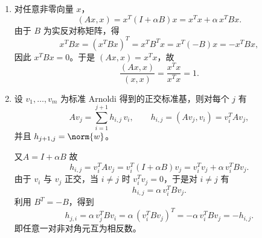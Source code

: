 \documentclass{ctexart}
\begin{document}
\begin{solution}
  \begin{enumerate}
    \item 对任意非零向量 $x$，
      \[
        (Ax,x) = x^T (I+\alpha B) x = x^T x + \alpha\, x^T B x.
      \]
      由于 $B$ 为实反对称矩阵，得
      \[
        x^T B x = (x^T B x)^T = x^T B^T x = x^T(-B) x = - x^T B x,
      \]
      因此 $x^T B x = 0$。于是 $(Ax,x)=x^T x$，故
      \[
        \frac{(Ax,x)}{(x,x)}=\frac{x^T x}{x^T x}=1.
      \]
    \item 设 $v_1,\dots,v_m$ 为标准 Arnoldi 得到的正交标准基，则对每个 $j$ 有
      \[
        A v_j = \sum_{i=1}^{j+1} h_{i,j}\, v_i,
        \qquad h_{i,j}=(Av_j, v_i)=v_i^T A v_j,
      \]
      并且 $h_{j+1,j}=\norm{w}$。

      又$A=I+\alpha B$ 故
      \[
        h_{i,j} = v_i^T A v_j = v_i^T (I+\alpha B) v_j
        = v_i^T v_j + \alpha\, v_i^T B v_j.
      \]
      由于 $v_i$ 与 $v_j$ 正交，当 $i\neq j$ 时 $v_i^T v_j=0$，于是对 $i\ne j$ 有
      \[
        h_{i,j} = \alpha\, v_i^T B v_j.
      \]
      利用 $B^T=-B$，得到
      \[
        h_{j,i} = \alpha\, v_j^T B v_i = \alpha\, (v_i^T B v_j)^T = -\alpha\, v_i^T B v_j = -h_{i,j}.
      \]
      即任意一对非对角元互为相反数。


\end{enumerate}
\end{solution}
\end{document}
